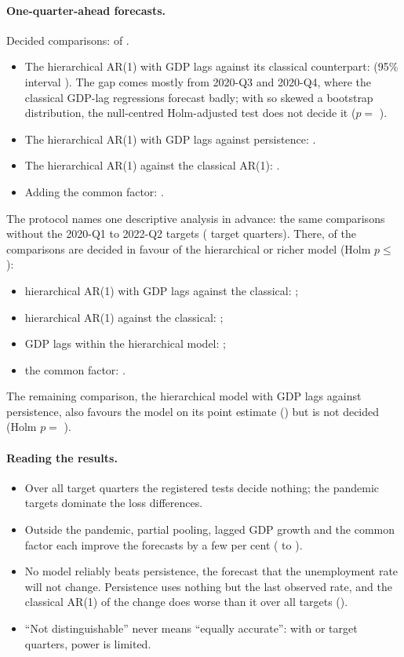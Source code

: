 \paragraph{One-quarter-ahead forecasts.} Decided comparisons:  of
.
\begin{itemize}
  \item The hierarchical AR(1) with GDP lags against its classical counterpart:
     (95\% interval ). The gap comes mostly from
    2020-Q3 and 2020-Q4, where the classical GDP-lag regressions forecast badly; with so
    skewed a bootstrap distribution, the null-centred Holm-adjusted test does not decide it
    ($p=$ ).
  \item The hierarchical AR(1) with GDP lags against persistence: .
  \item The hierarchical AR(1) against the classical AR(1): .
  \item Adding the common factor: .
\end{itemize}
The protocol names one descriptive analysis in advance: the same comparisons without the
2020-Q1 to 2022-Q2 targets ( target quarters). There, 
of the  comparisons are decided in favour of the hierarchical or richer model
(Holm $p\le$ ):
\begin{itemize}
  \item hierarchical AR(1) with GDP lags against the classical: ;
  \item hierarchical AR(1) against the classical: ;
  \item GDP lags within the hierarchical model: ;
  \item the common factor: .
\end{itemize}
The remaining comparison, the hierarchical model with GDP lags against persistence, also
favours the model on its point estimate () but is not decided (Holm $p=$
).

\paragraph{Reading the results.}
\begin{itemize}
  \item Over all target quarters the registered tests decide nothing; the pandemic
    targets dominate the loss differences.
  \item Outside the pandemic, partial pooling, lagged GDP growth and the common factor
    each improve the forecasts by a few per cent ( to
    ).
  \item No model reliably beats persistence, the forecast that the unemployment rate will
    not change. Persistence uses nothing but the last observed rate, and the classical
    AR(1) of the change does worse than it over all targets ().
  \item ``Not distinguishable'' never means ``equally accurate'': with
     or  target quarters, power is limited.
\end{itemize}

